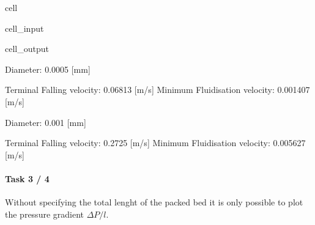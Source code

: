 \documentclass[letterpaper,10pt,english]{jupyterBook}
\begin{document}
\begin{sphinxuseclass}{cell}
\begin{sphinxVerbatimInput}
\begin{sphinxuseclass}{cell_input}
\end{sphinxuseclass}\end{sphinxVerbatimInput}
\begin{sphinxVerbatimOutput}

\begin{sphinxuseclass}{cell_output}
\begin{sphinxVerbatim}[commandchars=\\\{\}]
Diameter:  0.0005  [mm]

Terminal Falling velocity:  0.06813  [m/s]
Minimum Fluidisation velocity:  0.001407  [m/s]

Diameter:  0.001  [mm]

Terminal Falling velocity:  0.2725  [m/s]
Minimum Fluidisation velocity:  0.005627  [m/s]
\end{sphinxVerbatim}

\end{sphinxuseclass}\end{sphinxVerbatimOutput}

\end{sphinxuseclass}

\paragraph{Task 3 / 4}
\label{\detokenize{Exercise_W11_2021:task-3-4}}
\sphinxAtStartPar
Without specifying the total lenght of the packed bed it is only possible to plot the pressure gradient \(\Delta{P}/l\).
\end{document}
